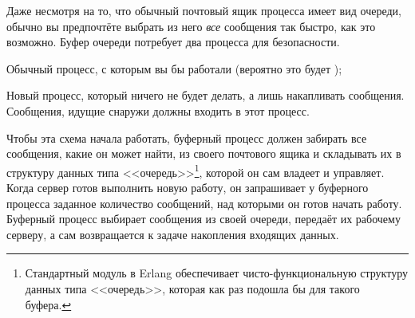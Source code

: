 Даже несмотря на то, что обычный почтовый ящик процесса имеет вид очереди, обычно вы предпочтёте выбрать из него \emph{все} сообщения так быстро, как это возможно. Буфер очереди потребует два процесса для безопасности.

\begin{itemize*}
	\item Обычный процесс, с которым вы бы работали (вероятно это будет );
	\item Новый процесс, который ничего не будет делать, а лишь накапливать сообщения. Сообщения, идущие снаружи должны входить в этот процесс.
\end{itemize*}

Чтобы эта схема начала работать, буферный процесс должен забирать все сообщения, какие он может найти, из своего почтового ящика и складывать их в структуру данных типа <<очередь>>\footnote{Стандартный модуль  в Erlang обеспечивает чисто-функциональную структуру данных типа <<очередь>>, которая как раз подошла бы для такого буфера.}, которой он сам владеет и управляет. Когда сервер готов выполнить новую работу, он запрашивает у буферного процесса заданное количество сообщений, над которыми он готов начать работу. Буферный процесс выбирает сообщения из своей очереди, передаёт их рабочему серверу, а сам возвращается к задаче накопления входящих данных.

